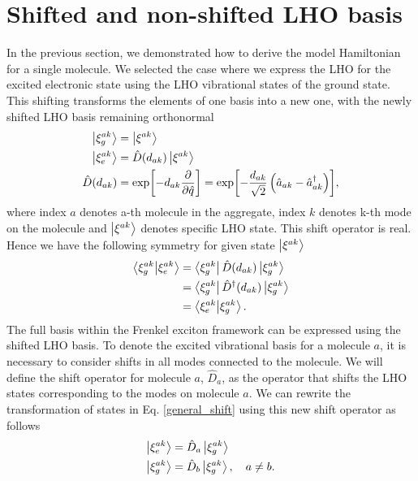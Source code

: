 \section{Shifted and non-shifted LHO basis}
\label{Shifted and non-shifted LHO basis}

In the previous section, we demonstrated how to derive the model Hamiltonian for a single molecule. We selected the case where we express the LHO for the excited electronic state using the LHO vibrational states of the ground state. This shifting transforms the elements of one basis into a new one, with the newly shifted LHO basis remaining orthonormal
\begin{equation}
\label{general_shift}
    \begin{aligned}
    \ket{\xi^{ak}_g} &= \ket{\xi^{ak}} \\
    \ket{\xi^{ak}_e} &= \hat{D}(d_{ak}) \ket{\xi^{ak}}  \\
    \hat{D}(d_{ak}) &= \exp[-d_{ak} \frac{\partial}{\partial \hat{q}}] = \exp[-\frac{d_{ak}}{\sqrt{2}}\left(\hat{a}_{ak}-\hat{a}_{ak}^{\dagger}\right)],
    \end{aligned}
\end{equation}
where index $a$ denotes a-th molecule in the aggregate, index $k$ denotes k-th mode on the molecule and $\ket{\xi^{ak}}$ denotes specific LHO state.
This shift operator is real. Hence we have the following symmetry for given state $\ket{\xi^{ak}}$
\begin{equation}
\label{shift_real_prop}
    \begin{aligned}
    \braket{\xi^{ak}_g}{\xi^{ak}_e} &= \bra{\xi^{ak}_g} \hat{D}(d_{ak}) \ket{\xi^{ak}_g} \\
    &= \bra{\xi^{ak}_g} \hat{D}^\dagger(d_{ak}) \ket{\xi^{ak}_g} \\
    &= \braket{\xi^{ak}_e}{\xi^{ak}_g}.
    \end{aligned}
\end{equation}
The full basis within the Frenkel exciton framework can be expressed using the shifted LHO basis. To denote the excited vibrational basis for a molecule $a$, it is necessary to consider shifts in all modes connected to the molecule. We will define the shift operator for molecule $a$, $\hat{D}_a$, as the operator that shifts the LHO states corresponding to the modes on molecule $a$. We can rewrite the transformation of states in Eq. \ref{general_shift} using this new shift operator as follows
\begin{equation}
\label{shift_operator_for_molecule_1}
    \begin{aligned}
    \ket{\xi^{ak}_e} &= \hat{D}_a \ket{\xi^{ak}_g} \\
    \ket{\xi^{ak}_g} &= \hat{D}_b \ket{\xi^{ak}_g}, \quad a \neq b. \\
    \end{aligned}
\end{equation}

